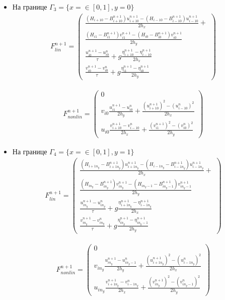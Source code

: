 \begin{itemize}
    \item На границе $\Gamma_3=\{x=\in[0,1],y=0\}$
	\begin{eqnarray}
	    \label{eq:ApproxFLinGamma3}
	    F^{n+1}_{lin}=\begin{pmatrix}
		\frac{(H_{i+10}-B_{i+10}^{n+1})u_{i+10}^{n+1}-(H_{i-10}-B_{i-10}^{n+1})u_{i-10}^{n+1}}{2h_x}+\\
		\frac{(H_{i1}-B_{i1}^{n+1})v_{i1}^{n+1}-(H_{i0}-B_{i0}^{n+1})v_{i0}^{n+1}}{2h_y}\\
		\frac{u_{i0}^{n+1}-u_{i0}^{n}}{\tau}+
		g\frac{\eta_{i+10}^{n+1}-\eta_{i-10}^{n+1}}{2h_x}\\
		\frac{v_{i0}^{n+1}-v_{i0}^{n}}{\tau}+
		g\frac{\eta_{i1}^{n+1}-\eta_{i0}^{n+1}}{2h_y}
	    \end{pmatrix}
	\end{eqnarray}

	\begin{eqnarray}
	    \label{eq:ApproxFNonlinGamma3}
	    F^{n+1}_{nonlin}=\begin{pmatrix}
		0\\
		v_{i0}\frac{u_{i1}^{n+1}-u_{i0}^{n}}{2h_y}+
		\frac{(u_{i+10}^{n+1})^2-(u_{i-10}^{n})^2}{2h_x}\\
		u_{i0}\frac{v_{i+10}^{n+1}-v_{i-10}^{n}}{2h_x}+
		\frac{(v_{i1}^{n+1})^2-(v_{i0}^{n})^2}{2h_y}
	    \end{pmatrix}
	\end{eqnarray}

    \item На границе $\Gamma_4=\{x=\in[0,1],y=1\}$
	\begin{eqnarray}
	    \label{eq:ApproxFLinGamma4}
	    F^{n+1}_{lin}=\begin{pmatrix}
		\frac{(H_{i+1n_{y}}-B_{i+1n_{y}}^{n+1})u_{i+1n_{y}}^{n+1}-(H_{i-1n_{y}}-B_{i-1n_{y}}^{n+1})u_{i-1n_{y}}^{n+1}}{2h_x}+\\
		\frac{(H_{in_{y}}-B_{in_{y}}^{n+1})v_{in_{y}}^{n+1}-(H_{in_{y}-1}-B_{in_{y}-1}^{n+1})v_{in_{y}-1}^{n+1}}{2h_y}\\
		\frac{u_{in_{y}}^{n+1}-u_{in_{y}}^{n}}{\tau}+
		g\frac{\eta_{i+1n_{y}}^{n+1}-\eta_{i-1n_{y}}^{n+1}}{2h_x}\\
		\frac{v_{in_{y}}^{n+1}-v_{in_{y}}^{n}}{\tau}+
		g\frac{\eta_{in_{y}}^{n+1}-\eta_{in_{y}-1}^{n+1}}{2h_y}
	    \end{pmatrix}
	\end{eqnarray}

	\begin{eqnarray}
	    \label{eq:ApproxFNonlinGamma4}
	    F^{n+1}_{nonlin}=\begin{pmatrix}
		0\\
		v_{in_{y}}\frac{u_{in_{y}}^{n+1}-u_{in_{y}-1}^{n}}{2h_y}+
		\frac{(u_{i+1n_{y}}^{n+1})^2-(u_{i-1n_{y}}^{n})^2}{2h_x}\\
		u_{in_{y}}\frac{v_{i+1n_{y}}^{n+1}-v_{i-1n_{y}}^{n}}{2h_x}+
		\frac{(v_{in_{y}}^{n+1})^2-(v_{in_{y}-1}^{n})^2}{2h_y}
	    \end{pmatrix}
	\end{eqnarray}

\end{itemize}

